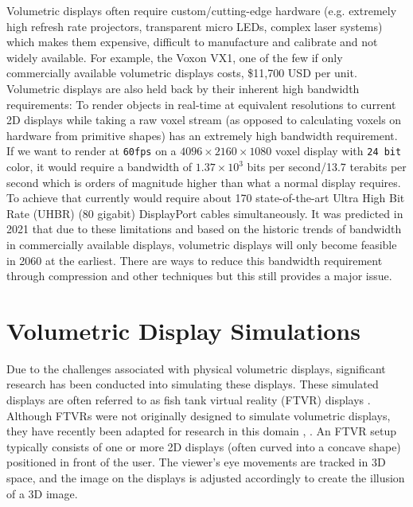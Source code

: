 Volumetric displays often require custom/cutting-edge hardware (e.g. extremely high refresh rate projectors,  transparent micro LEDs, complex laser systems) which makes them expensive, difficult to manufacture and calibrate and not widely available. For example, the Voxon VX1, one of the few if only commercially available volumetric displays costs, \$11,700 USD \cite{noauthor_products_nodate} per unit. \\

Volumetric displays are also held back by their inherent high bandwidth requirements: To render objects in real-time at equivalent resolutions to current 2D displays while taking a raw voxel stream (as opposed to calculating voxels on hardware from primitive shapes) has an extremely high bandwidth requirement. If we want to render at \texttt{60fps} on a $4096 \times 2160 \times 1080$ voxel display with \texttt{24 bit} color, it would require a bandwidth of $1.37 \times 10^3$ bits per second/13.7 terabits per second which is orders of magnitude higher than what a normal display requires. To achieve that currently would require about 170 state-of-the-art Ultra High Bit Rate (UHBR) (80 gigabit) DisplayPort cables simultaneously. It was predicted in 2021 \cite{LAM2021050011} that due to these limitations and based on the historic trends of bandwidth in commercially available displays, volumetric displays will only become feasible in 2060 at the earliest. There are ways to reduce this bandwidth requirement through compression and other techniques \cite{4487481} but this still provides a major issue. \\

\section{Volumetric Display Simulations}
Due to the challenges associated with physical volumetric displays, significant research has been conducted into simulating these displays. These simulated displays are often referred to as fish tank virtual reality (FTVR) displays \cite{10.1145/169059.169066}. Although FTVRs were not originally designed to simulate volumetric displays, they have recently been adapted for research in this domain \cite{10.1145/3281505.3281540}, \cite{Zabarauskas2012}. An FTVR setup typically consists of one or more 2D displays (often curved into a concave shape) positioned in front of the user. The viewer's eye movements are tracked in 3D space, and the image on the displays is adjusted accordingly to create the illusion of a 3D image. \\

